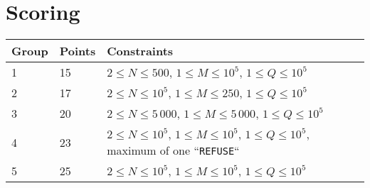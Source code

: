 \section*{Scoring}
\begin{tabular}{|l|l|l|}
    \hline
    Group & Points & Constraints \\ \hline
    1     &  15  & $2 \leq N \leq 500$,    $1 \leq M \leq 10^5$,   $1 \leq Q \leq 10^5$ \\ \hline %
    2     &  17  & $2 \leq N \leq 10^5$,   $1 \leq M \leq 250$,    $1 \leq Q \leq 10^5$ \\ \hline %
    3     &  20  & $2 \leq N \leq 5\,000$, $1 \leq M \leq 5\,000$, $1 \leq Q \leq 10^5$ \\ \hline %
    4     &  23  & $2 \leq N \leq 10^5$,   $1 \leq M \leq 10^5$,   $1 \leq Q \leq 10^5$, maximum of one ``\texttt{REFUSE}`` \\ \hline   %
    5     &  25  & $2 \leq N \leq 10^5$,   $1 \leq M \leq 10^5$,   $1 \leq Q \leq 10^5$ \\ \hline %
\end{tabular}

